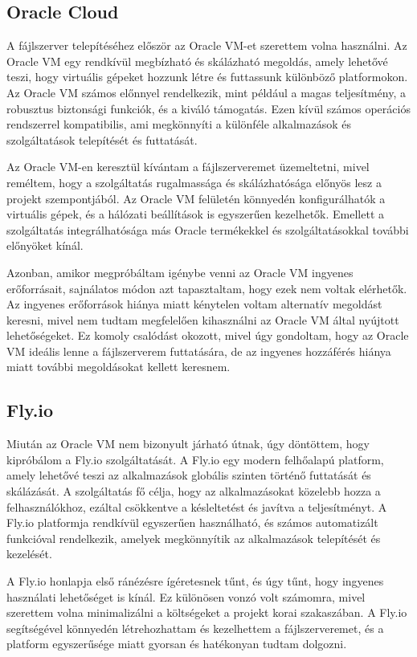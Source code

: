 \subsection{Oracle Cloud}
A fájlszerver telepítéséhez először az Oracle VM-et szerettem volna használni. Az Oracle VM egy rendkívül megbízható és skálázható megoldás, amely lehetővé teszi, hogy virtuális gépeket hozzunk létre és futtassunk különböző platformokon. Az Oracle VM számos előnnyel rendelkezik, mint például a magas teljesítmény, a robusztus biztonsági funkciók, és a kiváló támogatás. Ezen kívül számos operációs rendszerrel kompatibilis, ami megkönnyíti a különféle alkalmazások és szolgáltatások telepítését és futtatását.

Az Oracle VM-en keresztül kívántam a fájlszerveremet üzemeltetni, mivel reméltem, hogy a szolgáltatás rugalmassága és skálázhatósága előnyös lesz a projekt szempontjából. Az Oracle VM felületén könnyedén konfigurálhatók a virtuális gépek, és a hálózati beállítások is egyszerűen kezelhetők. Emellett a szolgáltatás integrálhatósága más Oracle termékekkel és szolgáltatásokkal további előnyöket kínál.

Azonban, amikor megpróbáltam igénybe venni az Oracle VM ingyenes erőforrásait, sajnálatos módon azt tapasztaltam, hogy ezek nem voltak elérhetők. Az ingyenes erőforrások hiánya miatt kénytelen voltam alternatív megoldást keresni, mivel nem tudtam megfelelően kihasználni az Oracle VM által nyújtott lehetőségeket. Ez komoly csalódást okozott, mivel úgy gondoltam, hogy az Oracle VM ideális lenne a fájlszerverem futtatására, de az ingyenes hozzáférés hiánya miatt további megoldásokat kellett keresnem.


\subsection{Fly.io}
Miután az Oracle VM nem bizonyult járható útnak, úgy döntöttem, hogy kipróbálom a Fly.io szolgáltatását. A Fly.io egy modern felhőalapú platform, amely lehetővé teszi az alkalmazások globális szinten történő futtatását és skálázását. A szolgáltatás fő célja, hogy az alkalmazásokat közelebb hozza a felhasználókhoz, ezáltal csökkentve a késleltetést és javítva a teljesítményt. A Fly.io platformja rendkívül egyszerűen használható, és számos automatizált funkcióval rendelkezik, amelyek megkönnyítik az alkalmazások telepítését és kezelését.

A Fly.io honlapja első ránézésre ígéretesnek tűnt, és úgy tűnt, hogy ingyenes használati lehetőséget is kínál. Ez különösen vonzó volt számomra, mivel szerettem volna minimalizálni a költségeket a projekt korai szakaszában. A Fly.io segítségével könnyedén létrehozhattam és kezelhettem a fájlszerveremet, és a platform egyszerűsége miatt gyorsan és hatékonyan tudtam dolgozni.

